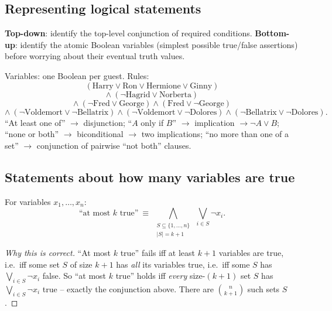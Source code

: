\documentclass[11pt]{article}
\begin{document}
\subsection{Representing logical statements}
\label{sec:4-18}

\begin{note}
\textbf{Top-down}: identify the top-level conjunction of required conditions. \textbf{Bottom-up}: identify the atomic Boolean variables (simplest possible true/false assertions) before worrying about their eventual truth values.
\end{note}

\begin{example}
Variables: one Boolean per guest. Rules:
\[
(\text{Harry}\vee\text{Ron}\vee\text{Hermione}\vee\text{Ginny})
\]
\[
\wedge\ (\neg\text{Hagrid}\vee\text{Norberta})
\]
\[
\wedge\ (\neg\text{Fred}\vee\text{George}) \wedge (\text{Fred}\vee\neg\text{George})
\]
\[
\wedge\ (\neg\text{Voldemort}\vee\neg\text{Bellatrix})\wedge(\neg\text{Voldemort}\vee\neg\text{Dolores})\wedge(\neg\text{Bellatrix}\vee\neg\text{Dolores}).
\]
``At least one of'' $\to$ disjunction; ``$A$ only if $B$'' $\to$ implication $\to \neg A\vee B$; ``none or both'' $\to$ biconditional $\to$ two implications; ``no more than one of a set'' $\to$ conjunction of pairwise ``not both'' clauses.
\end{example}

\subsection{Statements about how many variables are true}
\label{sec:4-19}

\begin{definition}
For variables $x_1,\dots,x_n$:
\[
\text{``at most } k \text{ true''} \ \equiv\ \bigwedge_{\substack{S\subseteq\{1,\dots,n\} \\ |S|=k+1}} \ \bigvee_{i\in S} \neg x_i.
\]
\end{definition}
\begin{proof}[Why this is correct]
``At most $k$ true'' fails iff at least $k+1$ variables are true, i.e.\ iff some set $S$ of size $k+1$ has \emph{all} its variables true, i.e.\ iff some $S$ has $\bigvee_{i\in S}\neg x_i$ false. So ``at most $k$ true'' holds iff \emph{every} size-$(k{+}1)$ set $S$ has $\bigvee_{i\in S}\neg x_i$ true -- exactly the conjunction above. There are $\binom{n}{k+1}$ such sets $S$.
\end{proof}
\end{document}
